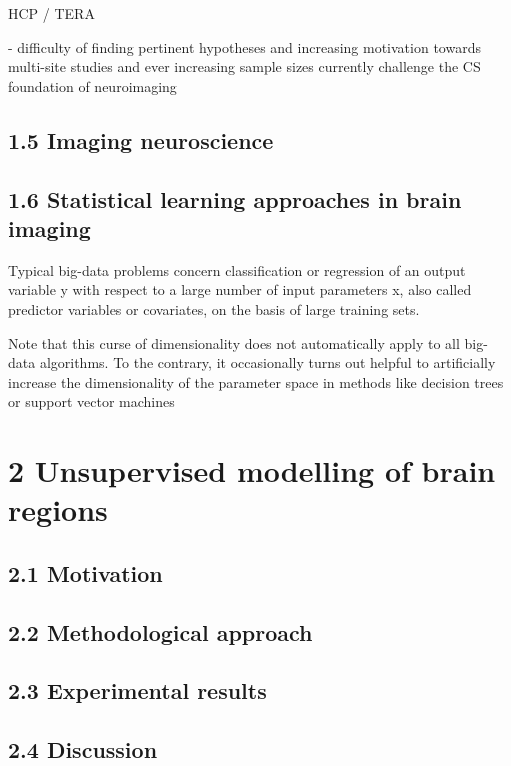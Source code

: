 \documentclass[authoryear,review,3p]{elsarticle}
\begin{document}
HCP / TERA


- difficulty of finding pertinent hypotheses and increasing motivation towards multi-site studies and ever increasing sample sizes currently challenge the CS foundation of neuroimaging




\subsection*{1.5 Imaging neuroscience}






\subsection*{1.6 Statistical learning approaches in brain imaging}









Typical big-data problems concern classification or regression of an output variable y with respect to a large number of input parameters x, also called predictor variables or covariates, on the basis of large training sets. 


Note that this curse of dimensionality does not automatically apply to all big-data algorithms. To the contrary, it occasionally turns out helpful to artificially increase the dimensionality of the parameter space in methods like decision trees or support vector machines 





\section*{2 Unsupervised modelling of brain regions}

\subsection*{2.1 Motivation}
\subsection*{2.2 Methodological approach}
\subsection*{2.3 Experimental results}
\subsection*{2.4 Discussion}
\end{document}
